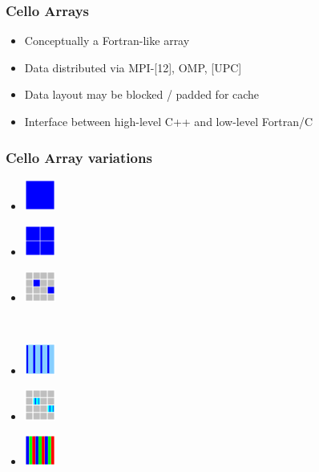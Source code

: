 
\begin{frame}
\frametitle{Cello Arrays}

\begin{itemize}
\item Conceptually a Fortran-like array
\item Data distributed via MPI-[12], OMP, [UPC]
\item Data layout may be blocked / padded for cache
\item Interface between high-level C++ and low-level Fortran/C
\end{itemize}
\end{frame}

\begin{frame}
\frametitle{Cello Array variations}

\begin{minipage}{1.8in}
\begin{itemize}
\item[]\includegraphics[width=0.4in]{array-serial.png} \ \ 
\item[]\includegraphics[width=0.4in]{array-block.png} \ \ 
\item[]\includegraphics[width=0.4in]{array-mpi.png} \ \ 
\end{itemize}
\end{minipage} \ 
\begin{minipage}{2in}
\begin{itemize}
\item[]\includegraphics[width=0.4in]{array-omp.png} \ \ 
\item[]\enhance{5-}\includegraphics[width=0.4in]{array-mpi-omp.png} \ \ 
\item[]\enhance{6-}\includegraphics[width=0.4in]{array-interleave.png} \ \ 
\end{itemize}
\end{minipage}

\end{frame}
